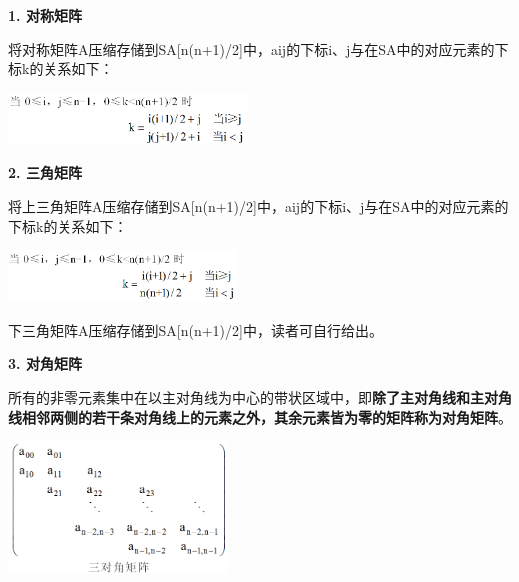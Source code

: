 {\textbf{1. 对称矩阵}}

{将对称矩阵A压缩存储到SA{[}n(n+1)/2{]}中，aij的下标i、j与在SA中的对应元素的下标k的关系如下：}

\includegraphics[width=2.50000in,height=0.54167in]{png-jpeg-pics/923EFD19FF65BD5EDFECF4ADEC3A717D.png}

{\textbf{2. 三角矩阵}}

{将上三角矩阵A压缩存储到SA{[}n(n+1)/2{]}中，aij的下标i、j与在SA中的对应元素的下标k的关系如下：}

\includegraphics[width=2.39583in,height=0.54167in]{png-jpeg-pics/E7283989C6C7D818334F39947B9EEB2A.png}

{下三角{矩阵A压缩存储到SA{[}n(n+1)/2{]}中}，读者可自行给出。}

{\textbf{3. 对角矩阵}}

{{所有的非零元素集中在以主对角线为中心的带状区域中}，即\textbf{除了主对角线和主对角线相邻两侧的若干条对角线上的元素之外，其余元素皆为零的矩阵称为对角矩阵}。}

\includegraphics[width=2.29167in,height=1.38542in]{png-jpeg-pics/484F3A07CB60CCCB7EB5FBD84C919F57.png}
